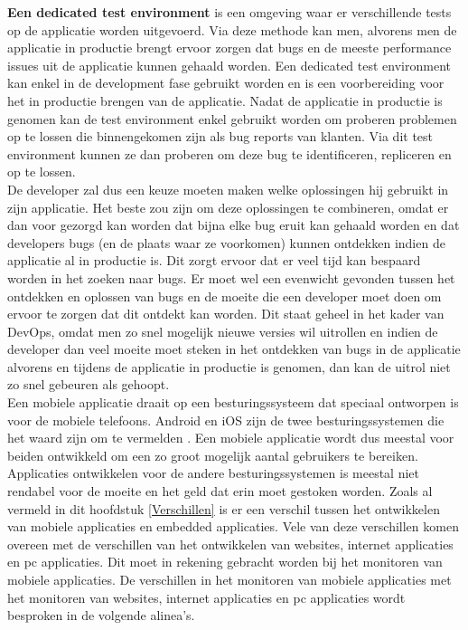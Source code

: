 \textbf{Een dedicated test environment} is een omgeving waar er verschillende tests op de applicatie worden uitgevoerd. Via deze methode kan men, alvorens men de applicatie in productie brengt ervoor zorgen dat bugs en de meeste performance issues uit de applicatie kunnen gehaald worden. Een dedicated test environment kan enkel in de development fase gebruikt worden en is een voorbereiding voor het in productie brengen van de applicatie. Nadat de applicatie in productie is genomen kan de test environment enkel gebruikt worden om proberen problemen op te lossen die binnengekomen zijn als bug reports van klanten. Via dit test environment kunnen ze dan proberen om deze bug te identificeren, repliceren en op te lossen. \\

De developer zal dus een keuze moeten maken welke oplossingen hij gebruikt in zijn applicatie. Het beste zou zijn om deze oplossingen te combineren, omdat er dan voor gezorgd kan worden dat bijna elke bug eruit kan gehaald worden en dat developers bugs (en de plaats waar ze voorkomen) kunnen ontdekken indien de applicatie al in productie is. Dit zorgt ervoor dat er veel tijd kan bespaard worden in het zoeken naar bugs. Er moet wel een evenwicht gevonden tussen het ontdekken en oplossen van bugs en de moeite die een developer moet doen om ervoor te zorgen dat dit ontdekt kan worden. Dit staat geheel in het kader van DevOps, omdat men zo snel mogelijk nieuwe versies wil uitrollen en indien de developer dan veel moeite moet steken in het ontdekken van bugs in de applicatie alvorens en tijdens de applicatie in productie is genomen, dan kan de uitrol niet zo snel gebeuren als gehoopt.\\


Een mobiele applicatie draait op een besturingssysteem dat speciaal ontworpen is voor de mobiele telefoons. Android en iOS zijn de twee besturingssystemen die het waard zijn om te vermelden \cite{MarketShare}. Een mobiele applicatie wordt dus meestal voor beiden ontwikkeld om een zo groot mogelijk aantal gebruikers te bereiken. Applicaties ontwikkelen voor de andere besturingssystemen is meestal niet rendabel voor de moeite en het geld dat erin moet gestoken worden. Zoals al vermeld in dit hoofdstuk \ref{Verschillen} is er een verschil tussen het ontwikkelen van mobiele applicaties en embedded applicaties. Vele van deze verschillen komen overeen met de verschillen van het ontwikkelen van websites, internet applicaties en pc applicaties. Dit moet in rekening gebracht worden bij het monitoren van mobiele applicaties. De verschillen in het monitoren van mobiele applicaties met het monitoren van websites, internet applicaties en pc applicaties wordt besproken in de volgende alinea's.\\

